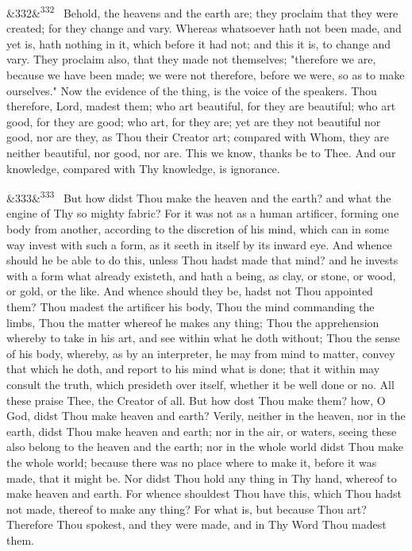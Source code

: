 \documentclass[12pt]{article}
\newcommand{\para}[1][]{\par\noindent\ifx&#1&\else\textsuperscript{\footnotesize #1}~\fi}
\begin{document}
\para[332] Behold, the heavens and the earth are; they proclaim that they were created; for they change and vary. Whereas whatsoever hath not been made, and yet is, hath nothing in it, which before it had not; and this it is, to change and vary. They proclaim also, that they made not themselves; "therefore we are, because we have been made; we were not therefore, before we were, so as to make ourselves." Now the evidence of the thing, is the voice of the speakers. Thou therefore, Lord, madest them; who art beautiful, for they are beautiful; who art good, for they are good; who art, for they are; yet are they not beautiful nor good, nor are they, as Thou their Creator art; compared with Whom, they are neither beautiful, nor good, nor are. This we know, thanks be to Thee. And our knowledge, compared with Thy knowledge, is ignorance.

\para[333] But how didst Thou make the heaven and the earth? and what the engine of Thy so mighty fabric? For it was not as a human artificer, forming one body from another, according to the discretion of his mind, which can in some way invest with such a form, as it seeth in itself by its inward eye. And whence should he be able to do this, unless Thou hadst made that mind? and he invests with a form what already existeth, and hath a being, as clay, or stone, or wood, or gold, or the like. And whence should they be, hadst not Thou appointed them? Thou madest the artificer his body, Thou the mind commanding the limbs, Thou the matter whereof he makes any thing; Thou the apprehension whereby to take in his art, and see within what he doth without; Thou the sense of his body, whereby, as by an interpreter, he may from mind to matter, convey that which he doth, and report to his mind what is done; that it within may consult the truth, which presideth over itself, whether it be well done or no. All these praise Thee, the Creator of all. But how dost Thou make them? how, O God, didst Thou make heaven and earth? Verily, neither in the heaven, nor in the earth, didst Thou make heaven and earth; nor in the air, or waters, seeing these also belong to the heaven and the earth; nor in the whole world didst Thou make the whole world; because there was no place where to make it, before it was made, that it might be. Nor didst Thou hold any thing in Thy hand, whereof to make heaven and earth. For whence shouldest Thou have this, which Thou hadst not made, thereof to make any thing? For what is, but because Thou art? Therefore Thou spokest, and they were made, and in Thy Word Thou madest them.
\end{document}
